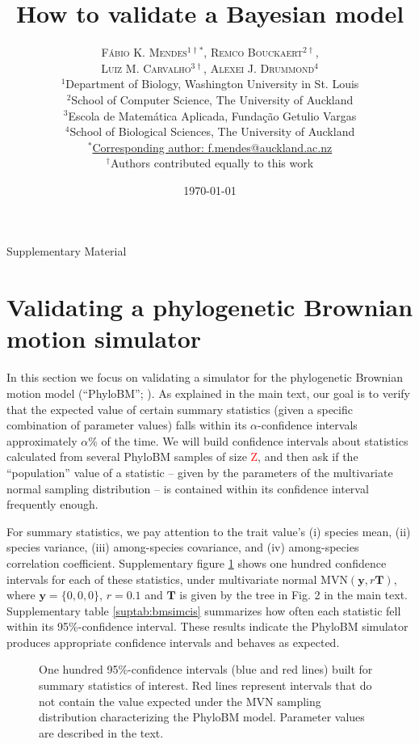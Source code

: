 \documentclass[oneside]{article}
\title{How to validate a Bayesian model} %
\author{\textsc{F\'{a}bio K. Mendes$^{1\dagger*}$}, \textsc{Remco Bouckaert$^{2\dagger}$},\\
\textsc{Luiz M. Carvalho$^{3\dagger}$}, \textsc{Alexei J. Drummond$^{4}$} \\
\small $^1$Department of Biology, Washington University in St. Louis\\
\small $^2$School of Computer Science, The University of Auckland\\
\small $^3$Escola de Matem\'{a}tica Aplicada, Fundaç\~{a}o Getulio Vargas\\
\small $^4$School of Biological Sciences, The University of Auckland\\
\small
\href{mailto:f.mendes@auckland.ac.nz}{$^*$Corresponding author: f.mendes@auckland.ac.nz}\\
{\small $^\dagger$Authors contributed equally to this work}
}
\date{\today} %
\begin{document}
\maketitle

\begin{center}
    \Large Supplementary Material
\end{center}

\newpage

\section{Validating a phylogenetic Brownian motion simulator}

In this section we focus on validating a simulator for the phylogenetic Brownian motion
model (``PhyloBM''; \citealp{felsenstein73}).
As explained in the main text, our goal is to verify that the expected value of certain
summary statistics (given a specific combination of parameter values) falls within its
$\alpha$-confidence intervals approximately $\alpha$\% of the time.
We will build confidence intervals about statistics calculated from several PhyloBM
samples of size \textcolor{red}{Z}, and then ask if the ``population'' value of 
a statistic -- given by the parameters of the multivariate normal sampling distribution --
is contained within its confidence interval frequently enough.

For summary statistics, we pay attention to the trait value's (i) species mean, (ii)
species variance, (iii) among-species covariance, and (iv) among-species correlation
coefficient.
Supplementary figure \ref{supfig:bmsimcis} shows one hundred confidence intervals for
each of these statistics, under multivariate normal $\text{MVN}(\boldsymbol{y},r\boldsymbol{T})$,
where $\boldsymbol{y}=\{0,0,0\}$, $r=0.1$ and $\boldsymbol{T}$ is given by the tree in
Fig. 2 in the main text.
Supplementary table \ref{suptab:bmsimcis} summarizes how often each statistic fell within
its 95\%-confidence interval.
These results indicate the PhyloBM simulator produces appropriate confidence intervals and behaves as expected.

\begin{figure}
  \centering
  
  \caption{One hundred 95\%-confidence intervals (blue and red
    lines) built for summary statistics of interest.
    Red lines represent intervals that do not contain the value
    expected under the MVN sampling distribution characterizing
    the PhyloBM model.
    Parameter values are described in the text.}
  \label{supfig:bmsimcis}
\end{figure}
\end{document}
